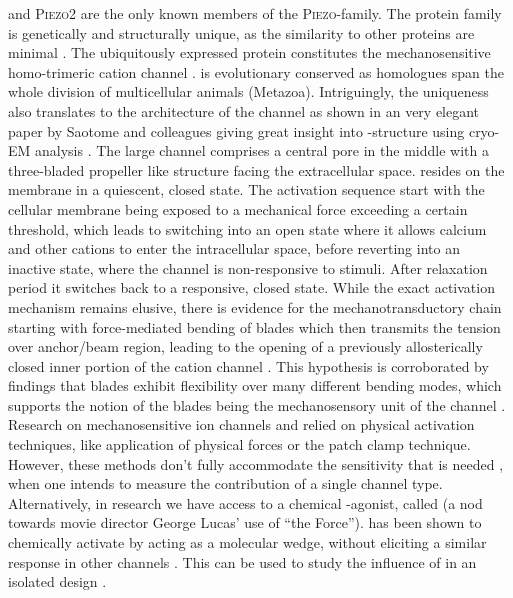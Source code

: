 \Piezo{} and \textsc{Piezo2} are the only known members of the \textsc{Piezo}-family. 
The protein family is genetically and structurally unique, as the similarity to other proteins are minimal \cite{Coste2010}. 
The ubiquitously expressed protein \Piezo{} constitutes the mechanosensitive homo-trimeric cation channel \Piezo{} \cite{Zhao2018}. \Piezo{} is evolutionary conserved as homologues span the whole division of multicellular animals (Metazoa). Intriguingly, the uniqueness also translates to the architecture of the channel as shown in an very elegant paper by Saotome and colleagues giving great insight into \Piezo{}-structure using cryo-EM analysis \cite{Saotome2018}. The large channel comprises a central pore in the middle with a three-bladed propeller like structure facing the extracellular space. \Piezo{} resides on the membrane in a quiescent, closed state. The activation sequence start with the cellular membrane being exposed to a mechanical force exceeding a certain threshold, which leads to \Piezo{} switching into an open state where it allows calcium and other cations to enter the intracellular space, before reverting into an inactive state, where the channel is non-responsive to stimuli. After relaxation period it switches back to a responsive, closed state. While the exact activation mechanism remains elusive, there is evidence for the mechanotransductory chain starting with force-mediated bending of blades which then transmits the tension over anchor/beam region, leading to the opening of a previously allosterically closed inner portion of the cation channel \cite{Zhao2018}. This hypothesis is corroborated by findings that blades exhibit flexibility over many different bending modes, which supports the notion of the blades being the mechanosensory unit of the channel \cite{Ge2015}. 
Research on mechanosensitive ion channels and \Piezo{} relied on physical activation techniques, like application of physical forces or the patch clamp technique. However, these methods don’t fully accommodate the sensitivity that is needed , when one intends to measure the contribution of a single channel type. \cite{Dubin2017} Alternatively, in research we have access to a chemical \Piezo{}-agonist, called \Yoda{} (a nod towards movie director George Lucas’ use of “the Force”). \Yoda{} has been shown to chemically activate \Piezo{} by acting as a molecular wedge, without eliciting a similar response in other channels \cite{Syeda2015, Lacroix2018}. This can be used to study the influence of \Piezo{} in an isolated design \cite{Botello-Smith2019}.

